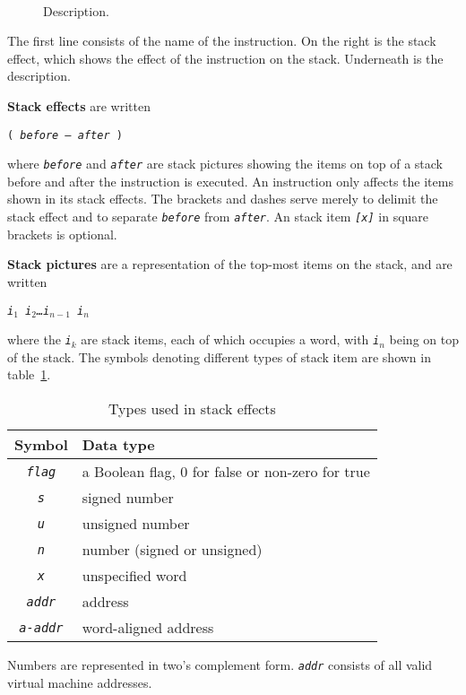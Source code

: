 \documentclass[a4paper]{article}
\newcommand{\spic}[1]{\texttt{\textsl{#1\/}}}
\newlength{\itemwidth}\itemwidth=\textwidth \advance\itemwidth by -0.1in
\newlength{\instname}\instname=1.5in
\newlength{\opcodewidth}\opcodewidth=0.5in
\newlength{\stackcom}\stackcom=2.5in
\newcommand{\inst}[3]{\item[]\parbox{\itemwidth}%
{\makebox[\instname][l]{\tt #1}\makebox[\opcodewidth]{}%
\makebox[\stackcom][r]{\tt ( \spic{#2} )}\\[0.5ex]#3}}
\begin{document}
\begin{description}
\inst{NAME}{before — after}{Description.}
\end{description}

The first line consists of the name of the instruction. On the right is the
stack effect, which shows the effect of the instruction on the stack.
Underneath is the description.

{\bf Stack effects} are written

\centerline{\tt ( \spic{before — after} )}

\noindent where \spic{before} and \spic{after} are stack pictures showing the items on top
of a stack before and after the instruction is executed.
An instruction only affects the items shown in its
stack effects. The brackets and dashes serve merely to delimit the stack
effect and to separate \spic{before} from \spic{after}.
An stack item \spic{[x]} in square brackets is optional.

{\bf Stack pictures}
are a representation of the top-most items on the stack, and are written

\centerline{\spic{i$_1$ i$_2$\dots i$_{n-1}$ i$_n$}}

\noindent where the \spic{i$_k$} are stack items, each of which occupies a word, with \spic{i$_n$} being on top of the stack. The symbols denoting different types of stack item are shown in table~\ref{typetable}.

\begin{table}[htbp]
\begin{center}
\begin{tabular}{cl} \toprule
\bf Symbol & \bf Data type \\ \midrule
\spic{flag} & a Boolean flag, $0$ for false or non-zero for true \\
\spic{s} & signed number \\
\spic{u} & unsigned number \\
\spic{n} & number (signed or unsigned) \\
\spic{x} & unspecified word \\
\spic{addr} & address \\
\spic{a-addr} & word-aligned address \\
\bottomrule
\end{tabular}
\caption{\label{typetable}Types used in stack effects}
\end{center}
\end{table}

Numbers are represented in two's complement form. \spic{addr} consists of all
valid virtual machine addresses.
\end{document}
